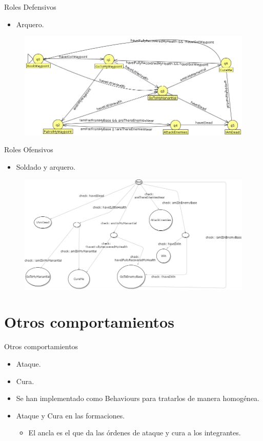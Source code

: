 \documentclass[10pt]{beamer}
\begin{document}
\begin{frame}{Roles Defensivos}
\begin{itemize}[<+- | alert@+>]
	\item Arquero.
\end{itemize}
\begin{figure}[!th]
	\includegraphics[scale=0.38]{images/defensive-archer}
\end{figure}
\end{frame}

\begin{frame}{Roles Ofensivos}
\begin{itemize}[<+- | alert@+>]
	\item Soldado y arquero.
\end{itemize}
\begin{figure}[!th]
	\includegraphics[scale=0.35]{images/arbolDecisionOfensivo}
\end{figure}
\end{frame}


\section{Otros comportamientos}
\begin{frame}{Otros comportamientos}
\begin{itemize}[<+- | alert@+>]
	\item Ataque.
	\item Cura.
	\item Se han implementado como Behaviours para tratarlos de manera homogénea.
	\item Ataque y Cura en las formaciones.
	\begin{itemize}[<+- | alert@+>]
	 \item El ancla es el que da las órdenes de ataque y cura a los integrantes.
	\end{itemize}

\end{itemize}
\end{frame}
\end{document}
